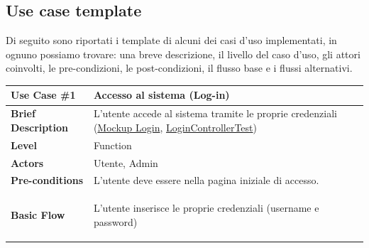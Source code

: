 \documentclass{article}
\begin{document}
\subsection{Use case template}\label{subsec:use-case-template}
Di seguito sono riportati i template di alcuni dei casi d'uso implementati, in ognuno possiamo trovare: una breve descrizione,
il livello del caso d'uso, gli attori coinvolti, le pre-condizioni, le post-condizioni, il flusso base e i flussi alternativi. \\
\clearpage
\vspace{0.5cm}

            \renewcommand{\arraystretch}{1.5}

            \begin{table}[h]
                \centering
                \small
                \begin{tabularx}{\textwidth}{|lX|}
                    \multicolumn{1}{l}{\rowcolor{grey!20} \textbf{Use Case \#1}} & \multicolumn{1}{l}{\textbf{Accesso al sistema (Log-in)}} \\
                    \bottomrule
                    \rowcolor{white} \textbf{Brief Description} & L'utente accede al sistema tramite le proprie credenziali (\hyperref[fig:mockup-login]{\small{Mockup Login}}, \hyperref[fig:logintest]{\small{LoginControllerTest}}) \\
                    \rowcolor{blue!10} \textbf{Level} & Function \\
                    \rowcolor{white} \textbf{Actors} & Utente, Admin \\
                    \rowcolor{blue!10} \textbf{Pre-conditions} & L'utente deve essere nella pagina iniziale di accesso.  \\
                    \rowcolor{white} \textbf{Basic Flow} & \begin{description}[nosep,before=\leavevmode\vspace*{-1\baselineskip},after=\leavevmode\vspace*{-1\baselineskip}]
                                                               \item [1.] L'utente inserisce le proprie credenziali (username e password)

\end{description}
\end{tabularx}
\end{table}
\end{document}
